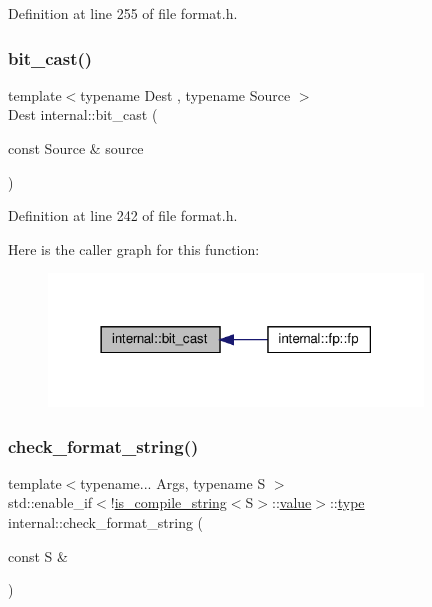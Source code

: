 Definition at line 255 of file format.\+h.

\mbox{\label{namespaceinternal_a838eb80d80234b98b1d95827f881af92}} 
\subsubsection{\texorpdfstring{bit\+\_\+cast()}{bit\_cast()}}
{\footnotesize\ttfamily template$<$typename Dest , typename Source $>$ \\
Dest internal\+::bit\+\_\+cast (\begin{DoxyParamCaption}\item[{const Source \&}]{source }\end{DoxyParamCaption})\hspace{0.3cm}{\ttfamily [inline]}}



Definition at line 242 of file format.\+h.

Here is the caller graph for this function\+:
\nopagebreak
\begin{figure}[H]
\begin{center}
\leavevmode
\includegraphics[width=282pt]{namespaceinternal_a838eb80d80234b98b1d95827f881af92_icgraph}
\end{center}
\end{figure}
\mbox{\label{namespaceinternal_a14d62818b14fe8556fdb1718e12fd1ab}} 
\subsubsection{\texorpdfstring{check\+\_\+format\+\_\+string()}{check\_format\_string()}\hspace{0.1cm}{\footnotesize\ttfamily [1/2]}}
{\footnotesize\ttfamily template$<$typename... Args, typename S $>$ \\
std\+::enable\+\_\+if$<$!\hyperlink{structis__compile__string}{is\+\_\+compile\+\_\+string}$<$S$>$\+::\hyperlink{classinternal_1_1value}{value}$>$\+::\hyperlink{namespaceinternal_a8661864098ac0acff9a6dd7e66f59038}{type} internal\+::check\+\_\+format\+\_\+string (\begin{DoxyParamCaption}\item[{const S \&}]{ }\end{DoxyParamCaption})\hspace{0.3cm}{\ttfamily [inline]}}



